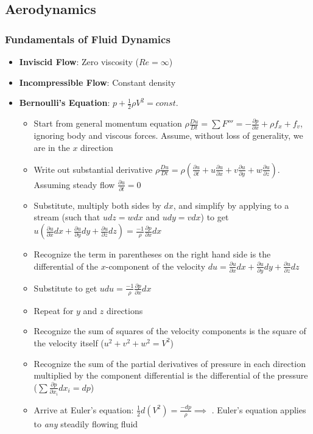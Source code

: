 \documentclass[12pt]{article}
\newcommand{\Item}[1]{\item \textbf{#1}:}
\begin{document}
\subsection{Aerodynamics}
\subsubsection{Fundamentals of Fluid Dynamics}
\begin{itemize}
\Item{Inviscid Flow} Zero viscosity ($Re = \infty$)
\Item{Incompressible Flow} Constant density
\Item{Bernoulli's Equation} $p + \frac{1}{2}\rho V^2 = const.$\\
	\begin{itemize}
	\item Start from general momentum equation $\rho\frac{Du}{Dt} = \sum F''' = -\frac{\partial p}{\partial x}+ \rho f_x + f_v$, ignoring body and viscous forces. Assume, without loss of generality, we are in the $x$ direction
	\item Write out substantial derivative $\rho\frac{Du}{Dt} = \rho\left(\frac{\partial u}{\partial t} + u\frac{\partial u}{\partial x} + v\frac{\partial u}{\partial y} + w\frac{\partial u}{\partial z}\right)$. Assuming steady flow $\frac{\partial u}{\partial t} = 0$
	\item Substitute, multiply both sides by $dx$, and simplify by applying to a stream (such that $udz=wdx$ and $udy=vdx$) to get $u\left(\frac{\partial u}{\partial x}dx+\frac{\partial u}{\partial y}dy+\frac{\partial u}{\partial z}dz\right)=\frac{-1}{\rho}\frac{\partial p}{\partial x}dx$
	\item Recognize the term in parentheses on the right hand side is the differential of the $x$-component of the velocity $du = \frac{\partial u}{\partial x}dx+\frac{\partial u}{\partial y}dy+\frac{\partial u}{\partial z}dz$
	\item Substitute to get $udu = \frac{-1}{\rho}\frac{\partial p}{\partial x}dx$
	\item Repeat for $y$ and $z$ directions
	\item Recognize the sum of squares of the velocity components is the square of the velocity itself ($u^2+v^2+w^2=V^2$)
	\item Recognize the sum of the partial derivatives of pressure in each direction multiplied by the component differential is the differential of the pressure ($\sum\frac{\partial p}{\partial x_i}dx_i = dp$)
	\item Arrive at Euler's equation: $\frac{1}{2}d(V^2) = \frac{-dp}{\rho}\implies$ . Euler's equation applies to \textit{any} steadily flowing fluid

\end{itemize}
\end{itemize}
\end{document}
